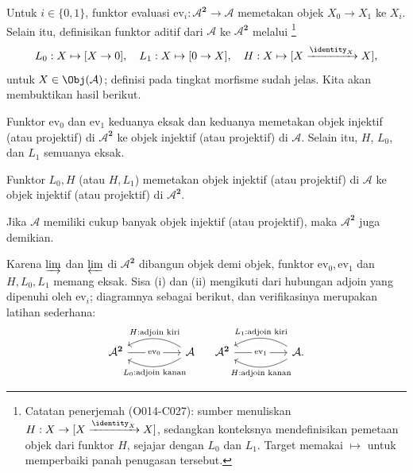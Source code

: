 \begin{contoh}
Untuk $i\in\{0,1\}$, funktor evaluasi
$\mathrm{ev}_i:\mathcal{A}^{\mathbf{2}}\to\mathcal{A}$ memetakan objek
$X_0\to X_1$ ke $X_i$. Selain itu, definisikan funktor aditif dari $\mathcal{A}$
ke $\mathcal{A}^{\mathbf{2}}$ melalui
\footnote{Catatan penerjemah (O014-C027): sumber menuliskan
$H:X\to[X\xrightarrow{\identity_X}X]$, sedangkan konteksnya mendefinisikan
pemetaan objek dari funktor $H$, sejajar dengan $L_0$ dan $L_1$. Target memakai
$\mapsto$ untuk memperbaiki panah penugasan tersebut.}
\[L_0:X\mapsto[X\to0],\quad L_1:X\mapsto[0\to X],\quad
H:X\mapsto[X\xrightarrow{\identity_X}X],\]
untuk $X\in\Obj(\mathcal{A})$; definisi pada tingkat morfisme sudah jelas. Kita akan
membuktikan hasil berikut.
\begin{compactenum}[(i)]
	\item Funktor $\mathrm{ev}_0$ dan $\mathrm{ev}_1$ keduanya eksak dan keduanya
	memetakan objek injektif (atau projektif) di $\mathcal{A}^{\mathbf{2}}$ ke objek
	injektif (atau projektif) di $\mathcal{A}$. Selain itu, $H$, $L_0$, dan $L_1$
	semuanya eksak.
	\item Funktor $L_0,H$ (atau $H,L_1$) memetakan objek injektif (atau projektif)
	di $\mathcal{A}$ ke objek injektif (atau projektif) di $\mathcal{A}^{\mathbf{2}}$.
	\item Jika $\mathcal{A}$ memiliki cukup banyak objek injektif (atau projektif),
	maka $\mathcal{A}^{\mathbf{2}}$ juga demikian.
\end{compactenum}

Karena $\varinjlim$ dan $\varprojlim$ di $\mathcal{A}^{\mathbf{2}}$ dibangun
objek demi objek, funktor $\mathrm{ev}_0,\mathrm{ev}_1$ dan $H,L_0,L_1$ memang eksak.
Sisa (i) dan (ii) mengikuti dari hubungan adjoin yang dipenuhi
oleh $\mathrm{ev}_i$; diagramnya sebagai berikut, dan verifikasinya merupakan
latihan sederhana:
\[\begin{tikzcd}[column sep=huge]
	\mathcal{A}^{\mathbf{2}} \arrow[r, "{\mathrm{ev}_0}" description] & \mathcal{A} \arrow[l, bend right, "{H: \text{adjoin kiri}}"'] \arrow[l, bend left, "L_0: \text{adjoin kanan}"] 
\end{tikzcd} \quad \begin{tikzcd}[column sep=huge]
	\mathcal{A}^{\mathbf{2}} \arrow[r, "{\mathrm{ev}_1}" description] & \mathcal{A} \arrow[l, bend right, "{L_1: \text{adjoin kiri}}"'] \arrow[l, bend left, "{H: \text{adjoin kanan}}"] .
\end{tikzcd}\]


\end{contoh}
